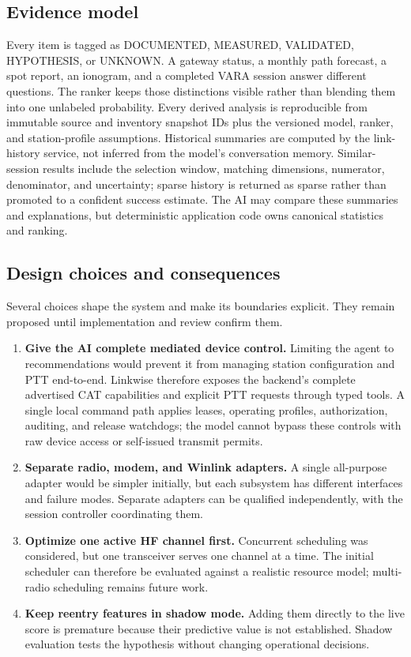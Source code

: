 \documentclass[11pt,a4paper]{article}
\newcommand{\evidence}[1]{\textsf{#1}}
\begin{document}
\subsection{Evidence model}
Every item is tagged as \evidence{DOCUMENTED}, \evidence{MEASURED},
\evidence{VALIDATED}, \evidence{HYPOTHESIS}, or \evidence{UNKNOWN}. A
gateway status, a monthly path forecast, a spot report, an ionogram, and a
completed VARA session answer different questions. The ranker keeps those
distinctions visible rather than blending them into one unlabeled probability.
Every derived analysis is reproducible from immutable source and inventory
snapshot IDs plus the versioned model, ranker, and station-profile
assumptions. Historical summaries are computed by the link-history service,
not inferred from the model's conversation memory. Similar-session results
include the selection window, matching dimensions, numerator, denominator,
and uncertainty; sparse history is returned as sparse rather than promoted
to a confident success estimate. The AI may compare these summaries and
explanations, but deterministic application code owns canonical statistics
and ranking.

\subsection{Design choices and consequences}
Several choices shape the system and make its boundaries explicit. They remain
proposed until implementation and review confirm them.
\begin{enumerate}
  \item \textbf{Give the AI complete mediated device control.} Limiting the
        agent to recommendations would prevent it from managing station
        configuration and PTT end-to-end. Linkwise therefore exposes the
        backend's complete advertised CAT capabilities and explicit PTT
        requests through typed tools. A single local command path applies
        leases, operating profiles, authorization, auditing, and release
        watchdogs; the model cannot bypass these controls with raw device
        access or self-issued transmit permits.
  \item \textbf{Separate radio, modem, and Winlink adapters.} A single
        all-purpose adapter would be simpler initially, but each subsystem
        has different interfaces and failure modes. Separate adapters can be
        qualified independently, with the session controller coordinating
        them.
  \item \textbf{Optimize one active HF channel first.} Concurrent scheduling
        was considered, but one transceiver serves one channel at a time. The
        initial scheduler can therefore be evaluated against a realistic
        resource model; multi-radio scheduling remains future work.
  \item \textbf{Keep reentry features in shadow mode.} Adding them directly to
        the live score is premature because their predictive value is not
        established. Shadow evaluation tests the hypothesis without changing
        operational decisions.
\end{enumerate}
\end{document}
